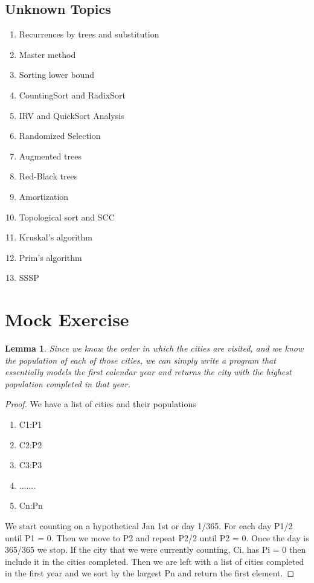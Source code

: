 \documentclass[12pt]{article}
\newtheorem{lemma}{Lemma}
\begin{document}
\subsection{Unknown Topics}
	\begin{enumerate}
		\item Recurrences by trees and substitution
		\item Master method
		\item Sorting lower bound
		\item CountingSort and RadixSort
		\item IRV and QuickSort Analysis
		\item Randomized Selection
		\item Augmented trees
		\item Red-Black trees
		\item Amortization
		\item Topological sort and SCC
		\item Kruskal’s algorithm
		\item Prim’s algorithm
		\item SSSP
	\end{enumerate}

\pagebreak

\section{Mock Exercise}

\begin{lemma}
Since we know the order in which the cities are visited, and we know the population of each of those cities, we can simply write a program that essentially models the first calendar year and returns the city with the highest population completed in that year.
\end{lemma}

\begin{proof}

We have a list of cities and their populations

\begin{enumerate}
	\item C1:P1
	\item C2:P2
	\item C3:P3
	\item .......
	\item Cn:Pn
\end{enumerate}

We start counting on a hypothetical Jan 1st or day 1/365. For each day P1/2 until P1 = 0. Then we move to P2 and repeat P2/2 until P2 = 0. Once the day is 365/365 we stop. If the city that we were currently counting, Ci, has Pi = 0 then include it in the cities completed. Then we are left with a list of cities completed in the first year and we sort by the largest Pn and return the first element.

\end{proof}
\end{document}
